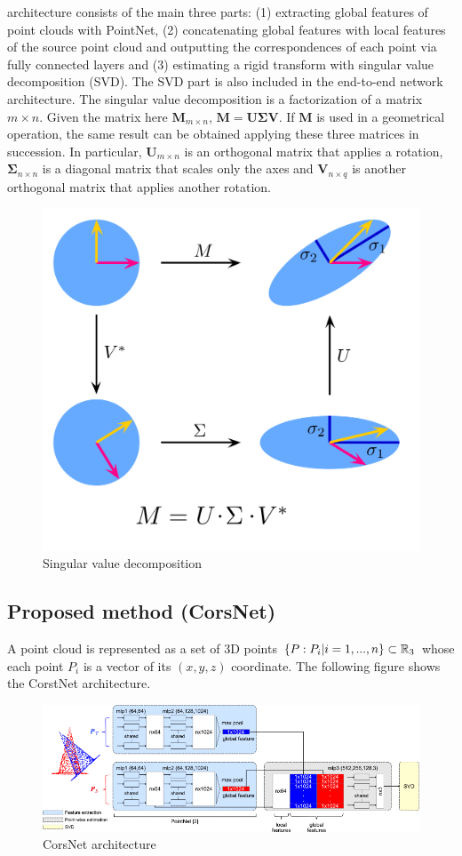 architecture consists of the main three parts: (1) extracting global
features of point clouds with PointNet, (2) concatenating global
features with local features of the source point cloud and outputting
the correspondences of each point via fully connected layers and (3)
estimating a rigid transform with singular value decomposition (SVD).
The SVD part is also included in the end-to-end network architecture.
The singular value decomposition is a factorization of a matrix
$m \times n$. Given the matrix here $\mathbf {M}_{m\times n}$,
$\mathbf{M} = \mathbf{U}\mathbf{\Sigma}\mathbf{V}$. If $\mathbf {M}$ is used
in a geometrical operation, the same result can be obtained applying
these three matrices in succession. In particular,
$\mathbf {U}_{m\times n}$ is an orthogonal matrix that applies a
rotation, $\mathbf{\Sigma}_{n\times n}$ is a diagonal matrix that scales only
the axes and $\mathbf {V}_{n\times q}$ is another orthogonal matrix
that applies another rotation.
\newpage
\begin{figure}[h!]
\centering
\includegraphics[width=0.7\linewidth]{images/singolarvaluedec.png}
\caption{Singular value decomposition}
\end{figure}

\subsection{Proposed method (CorsNet)}\label{header-n539}

A point cloud is represented as a set of 3D points
$\{P : P_i|i = 1, . . ., n\} \subset \mathbb{R}_3$ whose each point $P_i$ is
a vector of its $(x, y, z)$ coordinate. The following figure shows the
CorstNet architecture.

\begin{figure}[h!]
\centering
\includegraphics[width=0.8\linewidth]{images/corsnetarch.png}
\caption{CorsNet architecture}
\end{figure}

